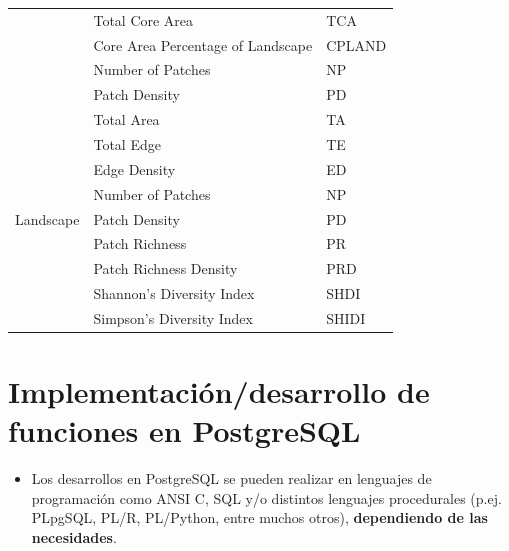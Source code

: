 \begin{table}[]
\begin{tabular}{lll}
                           & Total Core Area                      & TCA                  \\
                           & Core Area Percentage of Landscape    & CPLAND               \\
                           & Number of Patches                    & NP                   \\
                           & Patch Density                        & PD                   \\ \hline
\multirow{9}{*}{Landscape} & Total Area                           & TA                   \\
                           & Total Edge                           & TE                   \\
                           & Edge Density                         & ED                   \\
                           & Number of Patches                    & NP                   \\
                           & Patch Density                        & PD                   \\
                           & Patch Richness                       & PR                   \\
                           & Patch Richness Density               & PRD                  \\
                           & Shannon's Diversity Index            & SHDI                 \\
                           & Simpson's Diversity Index            & SHIDI                \\ \hline
\end{tabular}
\end{table}


\section{Implementación/desarrollo de funciones en PostgreSQL}

\begin{graybox}
\begin{itemize}
\item Los desarrollos en PostgreSQL se pueden realizar en lenguajes de programación como ANSI C, SQL y/o distintos lenguajes procedurales (p.ej. PLpgSQL, PL/R, PL/Python, entre muchos otros), \textbf{dependiendo de las necesidades}.
\end{itemize}
\end{graybox}



